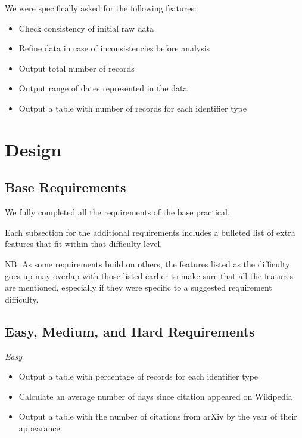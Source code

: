 \documentclass[12pt,a4paper,final]{article}
\begin{document}
We were specifically asked for the following features:

\begin{itemize}[noitemsep]
    \item Check consistency of initial raw data
    \item Refine data in case of inconsistencies before analysis
    \item Output total number of records
    \item Output range of dates represented in the data
    \item Output a table with number of records for each identifier type
\end{itemize}

\section*{Design}

\subsection*{Base Requirements}

We fully completed all the requirements of the base practical.

Each subsection for the additional requirements includes a bulleted list of
extra features that fit within that difficulty level.

NB: As some requirements build on others, the features listed as the difficulty goes
up may overlap with those listed earlier to make sure that all the features are mentioned,
especially if they were specific to a suggested requirement difficulty.

\subsection*{Easy, Medium, and Hard Requirements}
\begin{center} \emph{Easy} \end{center}
\begin{itemize}[noitemsep]
    \item Output a table with percentage of records for each identifier type
    \item Calculate an average number of days since citation appeared on Wikipedia
    \item Output a table with the number of citations from arXiv by the year of their appearance.
\end{itemize}
\end{document}
